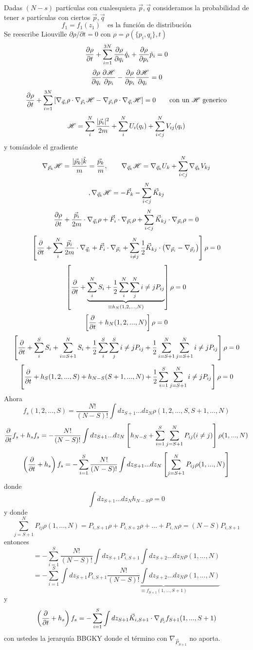 \documentclass[10pt,oneside]{CBFT_book}
\begin{document}
Dadas $(N-s)$ partículas con cualesquiera $\vec{p},\vec{q}$ consideramos la probabilidad de tener $s$
partículas con ciertos  $\vec{p},\vec{q}$
\[
	f_1 = f_1(z_1) \quad \text{es la función de distribución}
\]
Se reescribe Liouville $\partial{\rho}/\partial {t} = 0$ con $\rho = \rho( \{ p_i, q_i\},t )$
\[
	\frac{\partial^{\hspace{-0.05em}} {\rho}}{\partial {t}^{\hspace{-0.05em}}} +  \sum_{i=1}^{3N} \frac{\partial^{\hspace{-0.05em}} {\rho}}{\partial {q_i}^{\hspace{-0.05em}}} \dot{q}_i + \frac{\partial^{\hspace{-0.05em}} {\rho}}{\partial {p_i}^{\hspace{-0.05em}}} \dot{p}_i = 0
\]
\[
	\frac{\partial^{\hspace{-0.05em}} {\rho}}{\partial {q_i}^{\hspace{-0.05em}}} \frac{\partial^{\hspace{-0.05em}} {\mathscr{H}}}{\partial {p_i}^{\hspace{-0.05em}}} - \frac{\partial^{\hspace{-0.05em}} {\rho}}{\partial {p_i}^{\hspace{-0.05em}}} \frac{\partial^{\hspace{-0.05em}} {\mathscr{H}}}{\partial {q_i}^{\hspace{-0.05em}}} = 0
\]
\[
	\frac{\partial^{\hspace{-0.05em}} {\rho}}{\partial {t}^{\hspace{-0.05em}}} + \sum_{i=1}^{3N} \left[ \nabla_{\vec{q}_i}\rho \cdot \nabla_{\vec{p}_i}\mathscr{H} -
	\nabla_{\vec{p}_i}\rho \cdot \nabla_{\vec{q}_i}\mathscr{H} \right] = 0 \qquad \text{con un $\mathscr{H}$ generico}
\]
\[
	\mathscr{H} = \sum_i^N \frac{|\vec{p}_i|^2}{2m} + \sum_i^N U_i(q_i)+ \sum_{i<j}^N V_{ij}(q_i)
\]
y tomándole el gradiente
\[
	\nabla_{\vec{p}_k}\mathscr{H} = \frac{|\vec{p}_k|\hat{k}}{m} = \frac{\vec{p}_k}{m},\qquad
	\nabla_{\vec{q}_k}\mathscr{H} = \nabla_{\vec{q}_k}U_k + \sum_{i<j}^N \nabla_{\vec{q}_k} V_{kj}
\]
\[
				, \nabla_{\vec{q}_k}\mathscr{H} = -\vec{F}_k - \sum_{i<j}^N \vec{K}_{kj}
\]
\[
	\frac{\partial^{\hspace{-0.05em}} {\rho}}{\partial {t}^{\hspace{-0.05em}}} + \frac{\vec{p}_i}{2m} \cdot \nabla_{\vec{q}_i}\rho + \vec{F}_i \cdot \nabla_{\vec{p}_i}\rho + 
	\sum_{i<j}^N \vec{K}_{kj}\cdot \nabla_{\vec{p}_i} \rho = 0
\]
\[
	\left[ \frac{\partial^{\hspace{-0.05em}} {}}{\partial {t}^{\hspace{-0.05em}}} + \sum_i^N \frac{\vec{p}_i}{2m} \cdot \nabla_{\vec{q}_i} + 
	\vec{F}_i \cdot \nabla_{\vec{p}_i} + \sum_{i\neq j}^N \frac{1}{2}\vec{K}_{kj}\cdot \left( \nabla_{\vec{p}_i} -
	\nabla_{\vec{p}_j} \right) \right] \rho = 0
\]
\[
	\left[ \frac{\partial^{\hspace{-0.05em}} {}}{\partial {t}^{\hspace{-0.05em}}} + \underbrace{\sum_i^N S_i + \frac{1}{2} \sum_i^N\sum_j^N {i\neq j} P_{ij}}_{\equiv
	h_N(1,2,...,N)} \right] \rho = 0
\]
\[
	\left[ \frac{\partial^{\hspace{-0.05em}} {}}{\partial {t}^{\hspace{-0.05em}}} + h_N(1,2,...,N) \right] \rho = 0
\]
\[
	\left[ 
	\frac{\partial^{\hspace{-0.05em}} {}}{\partial {t}^{\hspace{-0.05em}}} + \sum_i^S S_i + \sum_{i=S+1}^N S_i + \frac{1}{2} \sum_i^S\sum_j^S {i\neq j} P_{ij} 
	+ \frac{1}{2} \sum_{i=S+1}^N\sum_{j=S+1}^N {i\neq j} P_{ij}
	\right] \rho = 0
\]
\[
	\left[ 
	\frac{\partial^{\hspace{-0.05em}} {}}{\partial {t}^{\hspace{-0.05em}}} + h_S(1,2,...,S)  + h_{N-S}(S+1,...,N)  + \frac{1}{2} \sum_{i=1}^S\sum_{j=S+1}^N {i\neq j} P_{ij}
	\right] \rho = 0
\]
Ahora
\[
	f_s(1,2,...,S) = \frac{N!}{(N-S)!} \int dz_{S+1} ... dz_N \rho(1,2,...,S,S+1,...,N)
\]
\[
	\frac{\partial^{\hspace{-0.05em}} {}}{\partial {t}^{\hspace{-0.05em}}}f_s + h_s f_s = -\frac{N!}{(N-S)!} \int dz_{S+1} ... dz_N
	\left[ h_{N-S} + \sum_{i=1}^S \sum_{j=S+1}^N P_{ij} (i\neq j)\right]\rho(1,...,N)
\]
\[
	\left( \frac{\partial^{\hspace{-0.05em}} {}}{\partial {t}^{\hspace{-0.05em}}} + h_s \right) f_s = - \sum_{i=1}^S \frac{N!}{(N-S)!} \int dz_{S+1} ... dz_N
	\left[ \sum_{j=S+1}^N P_{ij} \rho(1,...,N) \right]
\]
donde
\[
	\int dz_{S+1} ... dz_N h_{N-S} \rho = 0
\]
y donde 
\[
	\sum_{j=S+1}^N P_{ij}\rho(1,...,N) = P_{i,S+1}\rho + P_{i,S+2}\rho + ... + P_{i,N}\rho = (N-S)P_{i,S+1}
\]
entonces
\[
	= - \sum_{i=1}^S \frac{N!}{(N-S)!} \int dz_{S+1} P_{i,S+1} \int dz_{S+2} ... dz_N \rho(1,...,N)
\]
\[
	= - \sum_{i=1}^S \int dz_{S+1} P_{i,S+1} \underbrace{ \frac{N!}{(N-S)!} \int dz_{S+2} ... dz_N \rho(1,...,N) 
	}_{\equiv f_{S+1}(1,...,S+1)}
\]
y
\[
	\left( \frac{\partial^{\hspace{-0.05em}} {}}{\partial {t}^{\hspace{-0.05em}}} + h_s \right) f_s = - \sum_{i=1}^S \int dz_{S+1} \vec{K}_{i,S+1}\cdot \nabla_{\vec{P}_i} 
f_{S+1}(1,...,S+1)
\]
con ustedes la jerarquía BBGKY donde el término con $\nabla_{\vec{P}_{S+1}}$ no aporta.




\end{document}

